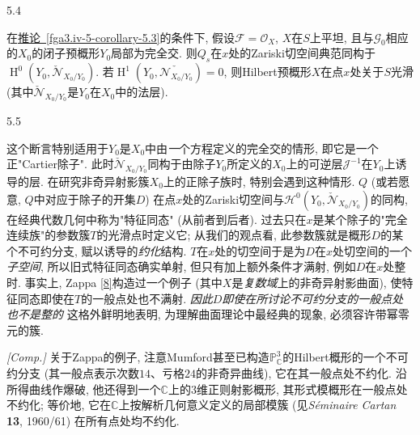 \begin{corollary}{5.4}\label{fga3.iv-5-corollary-5.4}\skipsinglepar
\par{}在\hyperref[fga3.iv-5-corollary-5.3]{推论~\ref*{fga3.iv-5-corollary-5.3}}的条件下, 假设\(\mathscr {F}=\mathcal {O}_X\), \(X\)在\(S\)上平坦, 且与\(\mathscr {G}_0\)相应的\(X_0\)的闭子预概形\(Y_0\)局部为完全交. 则\(Q_s\)在\(x\)处的Zariski切空间典范同构于\(\operatorname {H}^0(Y_0,\check {\mathscr {N}}_{X_0/Y_0})\). 若\(\operatorname {H}^1(Y_0,\check {\mathscr {N}_{X_0/Y_0}})=0\), 则Hilbert预概形\(X\)在点\(x\)处关于\(S\)光滑 (其中\(\check {\mathscr {N}}_{X_0/Y_0}\)是\(Y_0\)在\(X_0\)中的法层).
\end{corollary}
\begin{remark}{5.5}\label{fga3.iv-5-remark-5.5}\skipsinglepar
\par{}这个断言特别适用于\(Y_0\)是\(X_0\)中由\emph{一}个方程定义的完全交的情形, 即它是一个正"Cartier除子". 此时\(\check {\mathscr {N}}_{X_0/Y_0}\)同构于由除子\(Y_0\)所定义的\(X_0\)上的可逆层\(\mathscr {J}^{-1}\)在\(Y_0\)上诱导的层. 在研究非奇异射影簇\(X_0\)上的正除子族时, 特别会遇到这种情形. \(Q\) (或若愿意, \(Q\)中对应于除子的开集\(D\)) 在点\(x\)处的Zariski切空间与\(\mathscr {H}^0(Y_0,\check {\mathscr {N}}_{X_0/Y_0})\)的同构, 在经典代数几何中称为"特征同态" (从前者到后者). 过去只在\(x\)是某个除子的"完全连续族"的参数簇\(T\)的光滑点时定义它; 从我们的观点看, 此参数簇就是概形\(D\)的某个不可约分支, 赋以诱导的\emph{约化}结构. \(T\)在\(x\)处的切空间于是为\(D\)在\(x\)处切空间的一个\emph{子空间}, 所以旧式特征同态确实单射, 但只有加上额外条件才满射, 例如\(D\)在\(x\)处整时. 事实上, Zappa \hyperref[Zap1945]{[8]}构造过一个例子 (其中\(X\)是\emph{复数域}上的非奇异射影曲面), 使特征同态即使在\(T\)的一般点处也不满射. \emph{因此\(D\)即使在所讨论不可约分支的一般点处也不是整的} 这格外鲜明地表明, 为理解曲面理论中最经典的现象, 必须容许带幂零元的簇.
\par{}\emph{[Comp.]} 关于Zappa的例子, 注意Mumford甚至已构造\(\mathbb {P}_\mathbb {C}^3\)的Hilbert概形的一个不可约分支 (其一般点表示次数\(14\)、亏格\(24\)的非奇异曲线), 它在其一般点处不约化. 沿所得曲线作爆破, 他还得到一个\(\mathbb {C}\)上的\(3\)维正则射影概形, 其形式模概形在一般点处不约化; 等价地, 它在\(\mathbb {C}\)上按解析几何意义定义的局部模簇 (见\emph{Séminaire Cartan} \textbf{13}, 1960/61) 在所有点处均不约化.
\end{remark}
